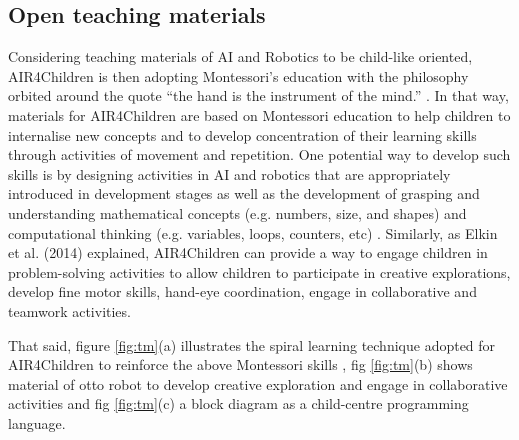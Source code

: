 \documentclass[sigconf]{acmart}
\begin{document}



\subsection{Open teaching materials}
Considering teaching materials of AI and Robotics to be child-like oriented, AIR4Children is then adopting Montessori's education with the philosophy orbited around the quote “the hand is the instrument of the mind.” \cite{montessori2013absorbent}.
In that way, materials for AIR4Children are based on Montessori education to help children to internalise new concepts and to develop concentration of their learning skills through activities of movement and repetition.
One potential way to develop such skills is by designing activities in AI and robotics that are appropriately introduced in development stages \cite{bers2008, bers-horn2010, kazakoff-bers2012} as well as the development of grasping and understanding mathematical concepts (e.g. numbers, size, and shapes) and computational thinking (e.g. variables, loops, counters, etc) \cite{bers2012, resnick1998}.
Similarly, as Elkin et al. (2014) \cite{elkin2014} explained, AIR4Children can provide a way to engage children in problem-solving activities to allow children to participate in creative explorations, develop fine motor skills, hand-eye coordination, engage in collaborative and teamwork activities.

That said, figure \ref{fig:tm}(a) illustrates the spiral learning technique adopted for AIR4Children to reinforce the above Montessori skills \cite{tarik2017}, fig \ref{fig:tm}(b) shows material of otto robot to develop creative exploration and engage in collaborative activities and fig \ref{fig:tm}(c) a block diagram as a child-centre programming language. 
\end{document}
